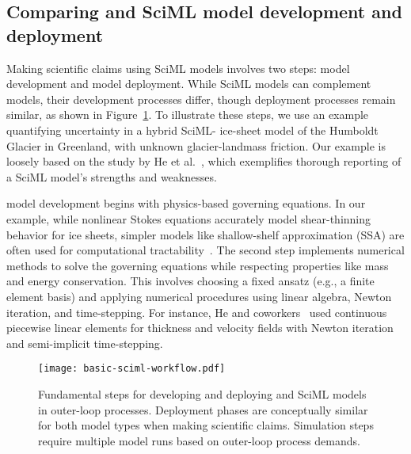 \subsection{Comparing \CSE{} and SciML model development and deployment}

Making scientific claims using SciML models involves two steps: model development and model deployment. 
While SciML models can complement \CSE{} models, their development processes differ, though deployment processes remain similar, as shown in Figure~\ref{fig:basic-sciml-workflow}.
To illustrate these steps, we use an example quantifying uncertainty in a hybrid SciML-\CSE{} ice-sheet model of the Humboldt Glacier in Greenland, with unknown glacier-landmass friction.
Our example is loosely based on the study by He et al.~\cite{He_PKS_JCP_2023}, which exemplifies thorough reporting of a SciML model's strengths and weaknesses.

\CSE{} model development begins with physics-based governing equations. In our example, while nonlinear Stokes equations accurately model shear-thinning behavior for ice sheets, simpler models like shallow-shelf approximation (SSA) are often used for computational tractability~\cite{He_PKS_JCP_2023}.
The second step implements numerical methods to solve  the governing equations while respecting properties like mass and energy conservation. This involves choosing a fixed ansatz (e.g., a finite element basis) and applying numerical procedures using linear algebra, Newton iteration, and time-stepping. For instance, He and coworkers~\cite{He_PKS_JCP_2023} used continuous piecewise linear elements for thickness and velocity fields with Newton iteration and semi-implicit time-stepping.

\begin{figure}[htb]
    \centering
    \texttt{[image: basic-sciml-workflow.pdf]}
    \caption{Fundamental steps for developing and deploying \CSE{} and SciML models in outer-loop processes. Deployment phases are conceptually similar for both model types when making scientific claims. Simulation steps require multiple model runs based on outer-loop process demands.}
    \label{fig:basic-sciml-workflow}
\end{figure}


